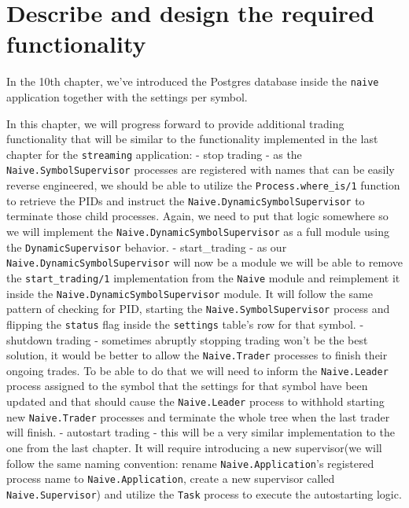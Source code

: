 \documentclass[
]{book}
\begin{document}
\hypertarget{describe-and-design-the-required-functionality-3}{%
\section{Describe and design the required functionality}\label{describe-and-design-the-required-functionality-3}}

In the 10th chapter, we've introduced the Postgres database inside the \texttt{naive} application together with the settings per symbol.

In this chapter, we will progress forward to provide additional trading functionality that will be similar to the functionality implemented in the last chapter for the \texttt{streaming} application:
- stop trading - as the \texttt{Naive.SymbolSupervisor} processes are registered with names that can be easily reverse engineered, we should be able to utilize the \texttt{Process.where\_is/1} function to retrieve the PIDs and instruct the \texttt{Naive.DynamicSymbolSupervisor} to terminate those child processes. Again, we need to put that logic somewhere so we will implement the \texttt{Naive.DynamicSymbolSupervisor} as a full module using the \texttt{DynamicSupervisor} behavior.
- start\_trading - as our \texttt{Naive.DynamicSymbolSupervisor} will now be a module we will be able to remove the \texttt{start\_trading/1} implementation from the \texttt{Naive} module and reimplement it inside the \texttt{Naive.DynamicSymbolSupervisor} module. It will follow the same pattern of checking for PID, starting the \texttt{Naive.SymbolSupervisor} process and flipping the \texttt{status} flag inside the \texttt{settings} table's row for that symbol.
- shutdown trading - sometimes abruptly stopping trading won't be the best solution, it would be better to allow the \texttt{Naive.Trader} processes to finish their ongoing trades. To be able to do that we will need to inform the \texttt{Naive.Leader} process assigned to the symbol that the settings for that symbol have been updated and that should cause the \texttt{Naive.Leader} process to withhold starting new \texttt{Naive.Trader} processes and terminate the whole tree when the last trader will finish.
- autostart trading - this will be a very similar implementation to the one from the last chapter. It will require introducing a new supervisor(we will follow the same naming convention: rename \texttt{Naive.Application}'s registered process name to \texttt{Naive.Application}, create a new supervisor called \texttt{Naive.Supervisor}) and utilize the \texttt{Task} process to execute the autostarting logic.
\end{document}
